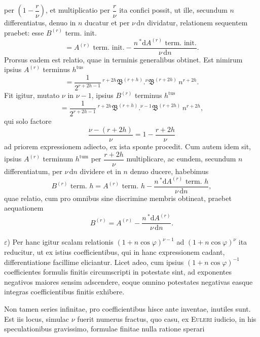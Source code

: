 per $\left(1-\dfrac{r}{\nu}\right)$, et multiplicatio per $\dfrac{r}{\nu}$ ita confici possit, ut
ille, secundum $n$ differentiatus, denuo in $n$ ducatur et per $\nu\,\mathrm{d}n$ dividatur,
relationem sequentem praebet: esse $B^{(r)}$ term. init.
\[
= A^{(r)}\text{ term. init.} - \frac{n\,{}^{*}\!\mathrm{d}A^{(r)}\text{ term. init.}}{\nu\,\mathrm{d}n}.
\]
Prorsus eadem est relatio, quae in terminis generalibus obtinet. Est nimirum ipsius
$A^{(r)}$ terminus $h^{\mathrm{tus}}$
\[
= \frac{1}{2^{r+2h-1}}\,{}^{r+2h}\mathfrak{B}^{(r+h)} . {}^{\nu}\mathfrak{B}^{(r+2h)}\,n^{r+2h}.
\]
Fit igitur, mutato $\nu$ in $\nu-1$, ipsius $B^{(r)}$ terminus $h^{\mathrm{tus}}$
\[
= \frac{1}{2^{r+2h-1}}\,{}^{r+2h}\mathfrak{B}^{(r+h)} . {}^{\nu-1}\mathfrak{B}^{(r+2h)}\,n^{r+2h},
\]
qui solo factore
\[
\frac{\nu-(r+2h)}{\nu} = 1 - \frac{r+2h}{\nu}
\]
ad priorem expressionem adiecto, ex ista sponte procedit. Cum autem idem sit, ipsius
$A^{(r)}$ terminum $h^{\mathrm{tum}}$ per $\dfrac{r+2h}{\nu}$ multiplicare, ac eundem, secundum
$n$ differentiatum, per $\nu\,\mathrm{d}n$ dividere et in $n$ denuo ducere, habebimus
\[
B^{(r)}\text{ term. }h = A^{(r)}\text{ term. }h - \frac{n\,{}^{*}\!\mathrm{d}A^{(r)}\text{ term. }h}{\nu\,\mathrm{d}n},
\]
quae relatio, cum pro omnibus sine discrimine membris obtineat, praebet aequationem
\[
B^{(r)} = A^{(r)} - \frac{n\,{}^{*}\!\mathrm{d}A^{(r)}}{\nu\,\mathrm{d}n}.
\]
\par\noindent\hspace*{\parindent}$\varepsilon$) Per hanc igitur scalam relationis $(1+n\cos\varphi)^{\nu-1}$ ad $(1+n\cos\varphi)^{\nu}$
ita reducitur, ut ex istius coefficientibus, qui in hanc expressionem cadant, differentiatione
facillime eliciantur. Licet adeo, cum ipsius $(1+n\cos\varphi)^{-1}$ coefficientes formulis
finitis circumscripti in potestate sint, ad exponentes negativos maiores sensim adscendere,
eoque omnino potestates negativas easque integras coefficientibus finitis exhibere.

Non tamen series infinitae, pro coefficientibus hisce ante inventae, inutiles sunt. Est iis
locus, simulac $\nu$ fuerit numerus fractus, quo casu, ex \textsc{Euleri} iudicio, in his
speculationibus gravissimo, formulae finitae nulla ratione sperari

